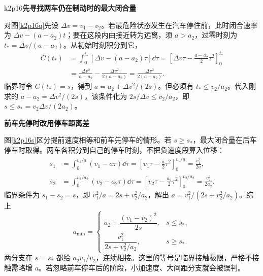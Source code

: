 \begin{drillsolution}{k2p16}\textbf{先寻找两车仍在制动时的最大闭合量}\par\nobreak
对图\ref{k2p16q}先设 $\Delta v=v_1-v_2$。若最危险状态发生在汽车停住前，此时闭合速率为 $\Delta v-(a-a_2)t$；要在这段内由接近转为远离，须 $a>a_2$，过零时刻为 $t_* =\Delta v/(a-a_2)$。从初始时刻积分到它，
\begin{align*}
 C(t_*)&=\int_0^{t_*}[\Delta v-(a-a_2)\tau]\dd\tau
 =\left[\Delta v\tau-\frac{a-a_2}{2}\tau^2\right]_0^{t_*}\\
 &=\frac{\Delta v^2}{a-a_2}-\frac{\Delta v^2}{2(a-a_2)}
 =\frac{\Delta v^2}{2(a-a_2)}.
\end{align*}
临界时令 $C(t_*)=s$，得到 $a=a_2+\Delta v^2/(2s)$。但必须有 $t_*\le v_2/a_2$。代入刚求的 $a-a_2=\Delta v^2/(2s)$，该条件化为 $2s/\Delta v\le v_2/a_2$，即 $s\le s_*=v_2\Delta v/(2a_2)$。



\par\medskip{}\noindent\textbf{前车先停时改用停车距离差}\par\nobreak
图\ref{k2p16s}区分提前速度相等和前车先停车的情形。若 $s\ge s_*$，最大闭合量在后车停车时取得。两车各积分到自己的停车时刻，不把负速度段算入位移：
\begin{align*}
 s_1&=\int_0^{v_1/a}(v_1-a\tau)\dd\tau
 =\left[v_1\tau-\frac a2\tau^2\right]_0^{v_1/a}
 =\frac{v_1^2}{2a},\\
 s_2&=\int_0^{v_2/a_2}(v_2-a_2\tau)\dd\tau
 =\left[v_2\tau-\frac{a_2}{2}\tau^2\right]_0^{v_2/a_2}
 =\frac{v_2^2}{2a_2}.
\end{align*}
临界条件为 $s_1-s_2=s$，即 $v_1^2/a=2s+v_2^2/a_2$，解出 $a=v_1^2/(2s+v_2^2/a_2)$。综上
\[\boxed{a_{\min}=\begin{cases}a_2+\dfrac{(v_1-v_2)^2}{2s},&s\le s_*,\\[3pt]\dfrac{v_1^2}{2s+v_2^2/a_2},&s\ge s_* .\end{cases}}\]
两分支在 $s=s_*$ 都给 $a_2v_1/v_2$，连续相接。这里的等号是临界接触极限，严格不接触需略增 $a$。若忽略前车停车后的阶段，小加速度、大间距分支就会被误判。




\end{drillsolution}
